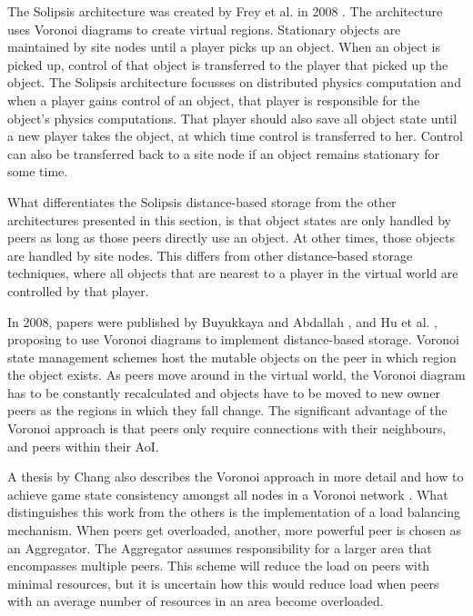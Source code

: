The Solipsis architecture was created by Frey et al. in 2008 \cite{solipsis}. The architecture uses Voronoi diagrams to create virtual regions.
Stationary objects are maintained by site nodes until a player picks up an object. When an object is picked up, control of that object is transferred
to the player that picked up the object. The Solipsis architecture focusses on distributed physics computation and when a player gains control of an
object, that player is responsible for the object's physics computations. That player should also save all object state until a new player takes the
object, at which time control is transferred to her. Control can also be transferred back to a site node if an object remains stationary for some
time.

What differentiates the Solipsis distance-based storage from the other architectures presented in this section, is that object states are only
handled by peers as long as those peers directly use an object. At other times, those objects are handled by site nodes. This differs from other
distance-based storage techniques, where all objects that are nearest to a player in the virtual world are controlled by that player.

In 2008, papers were published by Buyukkaya and Abdallah \cite{Buyukkaya_voronoi_state_management}, and Hu et al. \cite{Hu_voronoi_IM}, proposing to
use Voronoi diagrams \cite{voronoi_diagrams_survey} to implement distance-based storage. Voronoi state management schemes host the mutable objects on
the peer in which region the object exists. As peers move around in the virtual world, the Voronoi diagram has to be constantly recalculated and
objects have to be moved to new owner peers as the regions in which they fall change. The significant advantage of the Voronoi approach is that peers
only require connections with their neighbours, and peers within their AoI.

A thesis by Chang also describes the Voronoi approach in more detail and how to achieve game state consistency amongst all nodes in a Voronoi network
\cite{Chang_Voronoi_state_management_masters}. What distinguishes this work from the others is the implementation of a load balancing mechanism. When
peers get overloaded, another, more powerful peer is chosen as an Aggregator. The Aggregator assumes responsibility for a larger area that
encompasses multiple peers. This scheme will reduce the load on peers with minimal resources, but it is uncertain how this would reduce load when
peers with an average number of resources in an area become overloaded.

